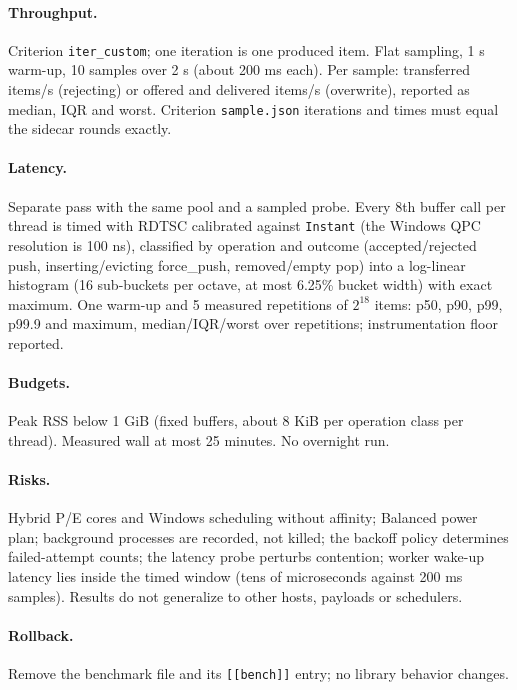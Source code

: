 \documentclass{article}
\begin{document}
\paragraph{Throughput.} Criterion \texttt{iter\_custom}; one iteration is one
produced item. Flat sampling, 1 s warm-up, 10 samples over 2 s (about 200 ms each).
Per sample: transferred items/s (rejecting) or offered and delivered items/s
(overwrite), reported as median, IQR and worst. Criterion \texttt{sample.json}
iterations and times must equal the sidecar rounds exactly.

\paragraph{Latency.} Separate pass with the same pool and a sampled probe. Every
8th buffer call per thread is timed with RDTSC calibrated against \texttt{Instant}
(the Windows QPC resolution is 100 ns), classified by operation and outcome
(accepted/rejected push, inserting/evicting force\_push, removed/empty pop) into a
log-linear histogram (16 sub-buckets per octave, at most 6.25\% bucket width) with
exact maximum. One warm-up and 5 measured repetitions of $2^{18}$ items: p50, p90,
p99, p99.9 and maximum, median/IQR/worst over repetitions; instrumentation floor
reported.

\paragraph{Budgets.} Peak RSS below 1 GiB (fixed buffers, about 8 KiB per
operation class per thread). Measured wall at most 25 minutes. No overnight run.

\paragraph{Risks.} Hybrid P/E cores and Windows scheduling without affinity;
Balanced power plan; background processes are recorded, not killed; the backoff
policy determines failed-attempt counts; the latency probe perturbs contention;
worker wake-up latency lies inside the timed window (tens of microseconds against
200 ms samples). Results do not generalize to other hosts, payloads or schedulers.

\paragraph{Rollback.} Remove the benchmark file and its \texttt{[[bench]]} entry;
no library behavior changes.


\end{document}
